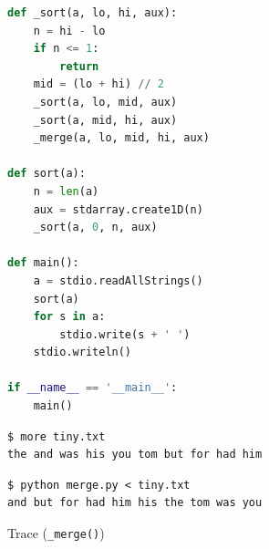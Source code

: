 \documentclass[8pt,a4paper,compress]{beamer}
\begin{document}
\begin{frame}[fragile]
\pause

\begin{lstlisting}[language=Python]
def _sort(a, lo, hi, aux):
    n = hi - lo
    if n <= 1:
        return
    mid = (lo + hi) // 2
    _sort(a, lo, mid, aux)
    _sort(a, mid, hi, aux)
    _merge(a, lo, mid, hi, aux)

def sort(a):
    n = len(a)
    aux = stdarray.create1D(n)
    _sort(a, 0, n, aux)

def main():
    a = stdio.readAllStrings()
    sort(a)
    for s in a:
        stdio.write(s + ' ')
    stdio.writeln()

if __name__ == '__main__':
    main()
\end{lstlisting}

\pause

\begin{lstlisting}[language={}]
$ more tiny.txt 
the and was his you tom but for had him
\end{lstlisting}

\pause

\begin{lstlisting}[language={}]
$ python merge.py < tiny.txt 
and but for had him his the tom was you 
\end{lstlisting}
\end{frame}

\begin{frame}[fragile]
\pause

Trace (\lstinline{_merge()})

\begin{center}
\end{center}
\end{frame}
\end{document}
